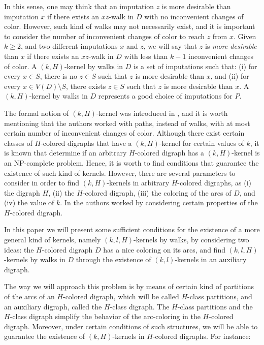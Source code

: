 \documentclass[10pt,a4paper]{article}
\begin{document}
In this sense, one may think that an imputation $z$ is more desirable than imputation $x$ if there exists an $xz$-walk in $D$ with no inconvenient changes of color. However, such kind of walks may not necessarily exist, and it is important to consider the number of inconvenient changes of color to reach $z$ from $x$. Given $k \geq 2$, and two different imputations $x$ and $z$, we will say that $z$ is \textit{more desirable} than $x$ if there exists an $xz$-walk in $D$ with less than $k-1$ inconvenient changes of color. A $(k,H)$-kernel by walks in $D$ is a set of imputations such that: (i) for every $x \in S$, there is no $z \in S$ such that $z$ is more desirable than $x$, and (ii) for every $x \in V(D) \setminus S$, there exists $z \in S$ such that $z$ is more desirable than $x$. A $(k,H)$-kernel by walks in $D$ represents a good choice of imputations for $P$. 

The formal notion of $(k,H)$-kernel was introduced in \cite{nearly}, and it is worth mentioning that the authors worked with paths, instead of walks, with at most certain number of inconvenient changes of color. 
Although there exist certain classes of $H$-colored digraphs that have a $(k,H)$-kernel for certain values of $k$, it is known that determine if an arbitrary $H$-colored digraph has a $(k,H)$-kernel is an NP-complete problem. Hence, it is worth to find conditions that guarantee the existence of such kind of kernels. However, there are several parameters to consider in order to find $(k,H)$-kernels in arbitrary $H$-colored digraphs, as (i) the digraph $H$, (ii) the $H$-colored digraph, (iii) the coloring of the arcs of $D$, and (iv) the value of $k$. In \cite{nearly} the authors worked by considering certain properties of the $H$-colored digraph.

In this paper we will present some sufficient conditions for the existence of a more general kind of kernels, namely $(k,l,H)$-kernels by walks, by 
considering two ideas: the $H$-colored digraph $D$ has a nice coloring on its arcs, and find $(k,l,H)$-kernels by walks in $D$ through the existence of $(k,l)$-kernels in an auxiliary digraph.

The way we will approach this problem is by means of certain kind of partitions of the arcs of an $H$-colored digraph, which will be called $H$-class partitions, and an auxiliary digraph, called the $H$-class digraph. The $H$-class partitions and the $H$-class digraph simplify the behavior of the arc-coloring in the $H$-colored digraph. Moreover, under certain conditions of such structures, we will be able to guarantee the existence of $(k,H)$-kernels in $H$-colored digraphs. For instance: 
\end{document}
